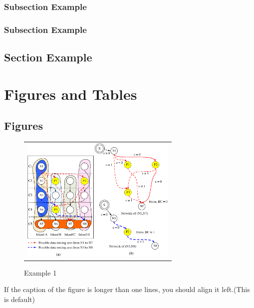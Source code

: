 \documentclass[doctor]{ewhacse}
\begin{document}
\lipsum[1]

\subsection{Subsection Example}

\lipsum[1]

\lipsum[1]

\subsection{Subsection Example}

\lipsum[1]

\section{Section Example}

\lipsum[1]

\chapter{Figures and Tables}
\section{Figures}
\par %

\lipsum[1]

\begin{figure}[htbp]
	{
		\begin{center}
			\begin{tabular}{c}
				\includegraphics[height=6cm]{Sample.eps}
			\end{tabular}
		\end{center}
	}
	\caption{Example 1}
\end{figure}

\newpage
If the caption of the figure is longer than one lines, you should align it left.(This is default)\\
\end{document}
